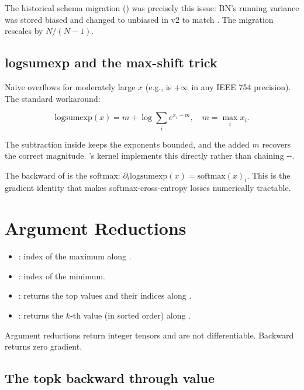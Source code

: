 The historical schema migration 
() was precisely this issue: BN's running
variance was stored biased and changed to unbiased in v2 to match
. The migration rescales by \(N/(N-1)\).

\subsection{logsumexp and the max-shift trick}
\label{ssec:reductions:logsumexp}

Naive  overflows for moderately large
\(x\) (e.g.,  is \(+\infty\) in any IEEE 754
precision). The standard workaround:

\[
\text{logsumexp}(x) = m + \log \sum_i e^{x_i - m},
\quad m = \max_i x_i.
\]

The subtraction inside  keeps the exponents bounded, and
the added \(m\) recovers the correct magnitude. \Lucid's
 kernel implements this directly rather than
chaining --.

The backward of  is the softmax:
\(\partial_i \text{logsumexp}(x) = \text{softmax}(x)_i\). This is
the gradient identity that makes softmax-cross-entropy losses
numerically tractable.

\section{Argument Reductions}
\label{sec:reductions:argument}

\begin{itemize}
  \item {}: index of the maximum along
    .
  \item {}: index of the minimum.
  \item {}: returns the top
     values and their indices along .
  \item {}: returns the \(k\)-th value (in
    sorted order) along .
\end{itemize}

Argument reductions return integer tensors and are not
differentiable. Backward returns zero gradient.

\subsection{The topk backward through value}
\label{ssec:reductions:topk_backward}

